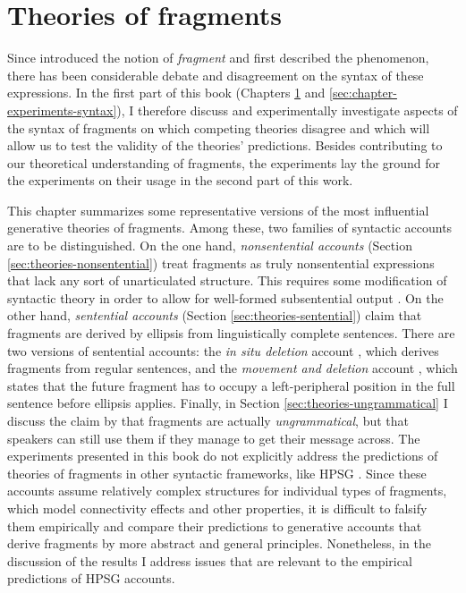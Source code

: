 \chapter{Theories of fragments} \label{sec:chapter-theories}

Since \citet{morgan1973} introduced the notion of \textit{fragment} and first described the phenomenon, there has been considerable debate and disagreement on the syntax of these expressions. In the first part of this book (Chapters \ref{sec:chapter-theories} and \ref{sec:chapter-experiments-syntax}), I therefore discuss and experimentally investigate aspects of the syntax of fragments on which competing theories disagree and which will allow us to test the validity of the theories' predictions. Besides contributing to our theoretical understanding of fragments, the experiments lay the ground for the experiments on their usage in the second part of this work.

This chapter summarizes some representative versions of the most influential generative theories of fragments. Among these, two families of syntactic accounts are to be distinguished. On the one hand, \textit{nonsentential accounts} (Section \ref{sec:theories-nonsentential}) treat fragments as truly nonsentential expressions that lack any sort of unarticulated structure. This requires some modification of syntactic theory in order to allow for well-formed subsentential output \citep[see e.g.][]{barton.progovac2005, fortin2007}. On the other hand, \textit{sentential accounts} (Section \ref{sec:theories-sentential}) claim that fragments are derived by ellipsis from linguistically complete sentences. There are two versions of sentential accounts: the \textit{in situ deletion} account \citep{reich2007}, which derives fragments from regular sentences, and the \textit{movement and deletion} account \citep{merchant2004}, which states that the future fragment has to occupy a left-peripheral position in the full sentence before ellipsis applies. Finally, in Section \ref{sec:theories-ungrammatical} I discuss the claim by \citet{bergen.goodman2015} that fragments are actually \textit{ungrammatical}, but that speakers can still use them if they manage to get their message across. The experiments presented in this book do not explicitly address the predictions of theories of fragments in other syntactic frameworks, like HPSG \citep{ginzburg.sag2000, fernandez.ginzburg2002, schlangen2003}. Since these accounts assume relatively complex structures for individual types of fragments, which model connectivity effects and other properties, it is difficult to falsify them empirically and compare their predictions to generative accounts that derive fragments by more abstract and general principles. Nonetheless, in the discussion of the results I address issues that are relevant to the empirical predictions of HPSG accounts.

